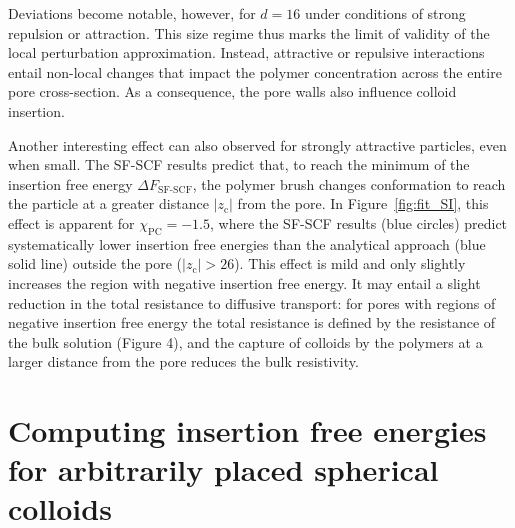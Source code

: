 \documentclass[10pt, a4paper, twocolumn]{article}
\begin{document}
Deviations become notable, however, for $d = 16$ under conditions of strong repulsion or attraction.
This size regime thus marks the limit of validity of the local perturbation approximation.
Instead, attractive or repulsive interactions entail non-local changes that impact the polymer concentration across the entire pore cross-section.
As a consequence, the pore walls also influence colloid insertion. 

Another interesting effect can also observed for strongly attractive particles, even when small.
The SF-SCF results predict that, to reach the minimum of the insertion free energy $\Delta F_{\text{SF-SCF}}$, the polymer brush changes conformation to reach the particle at a greater distance $|z_{\text{c}}|$ from the pore.
In Figure~\ref{fig:fit_SI}, this effect is apparent for $\chi_{\text{PC}} = -1.5$, where the SF-SCF results (blue circles) predict systematically lower insertion free energies than the analytical approach (blue solid line) outside the pore ($|z_{\text{c}}| > 26$).
This effect is mild and only slightly increases the region with negative insertion free energy.
It may entail a slight reduction in the total resistance to diffusive transport: for pores with regions of negative insertion free energy the total resistance is defined by the resistance of the bulk solution (Figure 4), and the capture of colloids by the polymers at a larger distance from the pore reduces the bulk resistivity.






\section{Computing insertion free energies for arbitrarily placed spherical colloids}
\end{document}
